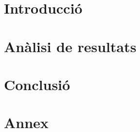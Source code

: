 \documentclass{article}
\begin{document}
\section{Introducció}
\section{Anàlisi de resultats}
\section{Conclusió}
\section{Annex}
\end{document}
